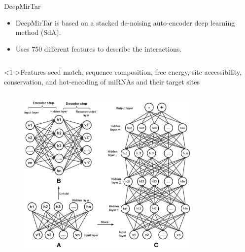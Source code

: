 \documentclass{beamer}
\begin{document}
\begin{frame}{DeepMirTar}
\begin{itemize}
\item DeepMirTar is based on a stacked de-noising auto-encoder deep learning method (SdA).
\item Uses 750 different features to describe the interactions.
\end{itemize}
\begin{column}{0.5\textwidth}
\begin{exampleblock}
		<1->{Features}
seed match, sequence composition, free energy, site accessibility, conservation, and hot-encoding of miRNAs and their target sites
\end{exampleblock}
\end{column}
\begin{column}{0.5\textwidth}
\begin{figure}[]
	  \centering
\includegraphics[width=0.8\textwidth,keepaspectratio]{images/deepmirtarsda.png}
\end{figure}
\end{column}
\end{frame}

\end{document}
